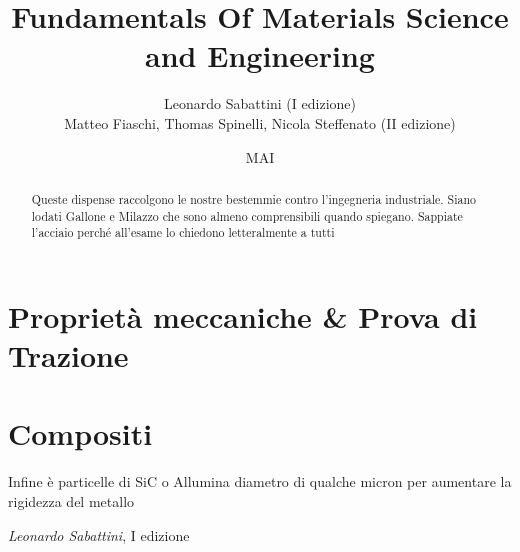 \documentclass{article}
\title{Fundamentals Of Materials Science and Engineering}
\author{Leonardo Sabattini (I edizione)\\
Matteo Fiaschi, Thomas Spinelli, Nicola Steffenato (II edizione)}
\date{MAI}
\begin{document}
\maketitle

\begin{abstract}
    Queste dispense raccolgono le nostre bestemmie contro l'ingegneria industriale. Siano lodati Gallone e Milazzo che sono almeno comprensibili quando spiegano. Sappiate l'acciaio perché all'esame lo chiedono letteralmente a tutti
\end{abstract}

\section{Proprietà meccaniche \& Prova di Trazione}













\newpage

\section{Compositi}

\epigraph{Infine è particelle di SiC o Allumina diametro di qualche micron per aumentare la rigidezza del metallo}{\textit{Leonardo Sabattini}, I edizione}
\end{document}
